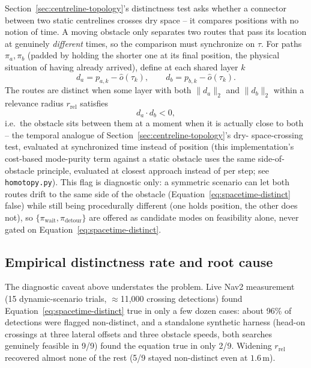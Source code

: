 \documentclass[11pt,a4paper]{article}
\begin{document}
Section~\ref{sec:centreline-topology}'s distinctness test asks whether a
connector between two static centrelines crosses dry space -- it compares
positions with no notion of time. A moving obstacle only separates two
routes that pass its location at genuinely \emph{different} times, so the
comparison must synchronize on $\tau$. For paths $\pi_a,\pi_b$ (padded by
holding the shorter one at its final position, the physical situation of
having already arrived), define at each shared layer $k$
\begin{equation}
  d_a=p_{a,k}-\hat o(\tau_k),\qquad
  d_b=p_{b,k}-\hat o(\tau_k).
  \label{eq:spacetime-side-vectors}
\end{equation}
The routes are distinct when some layer with both $\lVert d_a\rVert_2$ and
$\lVert d_b\rVert_2$ within a relevance radius $r_{\mathrm{rel}}$ satisfies
\begin{equation}
  d_a\cdot d_b<0,
  \label{eq:spacetime-distinct}
\end{equation}
i.e.\ the obstacle sits between them at a moment when it is actually close to
both -- the temporal analogue of Section~\ref{sec:centreline-topology}'s dry-
space-crossing test, evaluated at synchronized time instead of position (this
implementation's cost-based mode-purity term against a static obstacle uses
the same side-of-obstacle principle, evaluated at closest approach instead of
per step; see \texttt{homotopy.py}). This flag is diagnostic only: a
symmetric scenario can let both routes drift to the same side of the
obstacle (Equation~\eqref{eq:spacetime-distinct} false) while still being
procedurally different (one holds position, the other does not), so
$\{\pi_{\mathrm{wait}},\pi_{\mathrm{detour}}\}$ are offered as candidate
modes on feasibility alone, never gated on Equation~\eqref{eq:spacetime-distinct}.

\subsection{Empirical distinctness rate and root cause}
\label{sec:spacetime-empirical}

The diagnostic caveat above understates the problem. Live Nav2 measurement
(15 dynamic-scenario trials, $\approx$11{,}000 crossing detections) found
Equation~\eqref{eq:spacetime-distinct} true in only a few dozen cases: about
96\% of detections were flagged non-distinct, and a standalone synthetic
harness (head-on crossings at three lateral offsets and three obstacle
speeds, both searches genuinely feasible in 9/9) found the equation true in
only 2/9. Widening $r_{\mathrm{rel}}$ recovered almost none of the rest
(5/9 stayed non-distinct even at $1.6\,$m).
\end{document}
